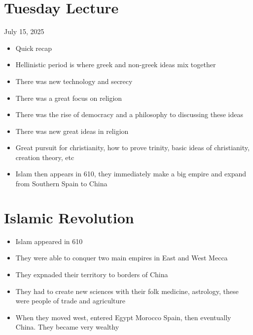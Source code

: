 \documentclass{article}
\begin{document}
\section*{Tuesday Lecture}
July 15, 2025
\begin{itemize}
  \item Quick recap
  \item Hellinistic period is where greek and non-greek ideas mix together
  \item There was new technology and secrecy
  \item There was a great focus on religion
  \item There was the rise of democracy and a philosophy to discussing these ideas
  \item There was new great ideas in religion
  \item Great pursuit for christianity, how to prove trinity,
    basic ideas of christianity, creation theory, etc
  \item Islam then appears in 610,
    they immediately make a big empire and expand from Southern Spain
    to China
\end{itemize}

\section{Islamic Revolution}

\begin{itemize}
  \item Islam appeared in 610
  \item They were able to conquer two main empires in East and West Mecca
  \item They expnaded their territory to borders of China
  \item They had to create new sciences with their folk medicine, astrology,
    these were people of trade and agriculture
  \item When they moved west, entered Egypt \rightarrow{} Morocco \rightarrow{} Spain, then eventually
    China. They became very wealthy
\end{itemize}
\end{document}
